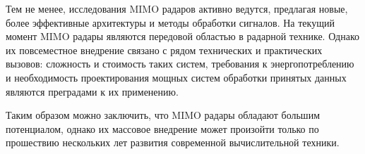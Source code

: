 Тем не менее, исследования MIMO радаров активно ведутся, предлагая новые, более эффективные архитектуры и 
методы обработки сигналов. 
На текущий момент MIMO радары являются передовой областью в радарной технике. 
Однако их повсеместное внедрение связано с рядом технических и практических вызовов: сложность и стоимость таких систем,
требования к энергопотреблению и необходимость проектирования 
мощных систем обработки принятых данных являются преградами к их применению. 

Таким образом можно заключить, что MIMO радары обладают большим потенциалом, 
однако их массовое внедрение может произойти только по прошествию 
нескольких лет развития современной вычислительной техники.
